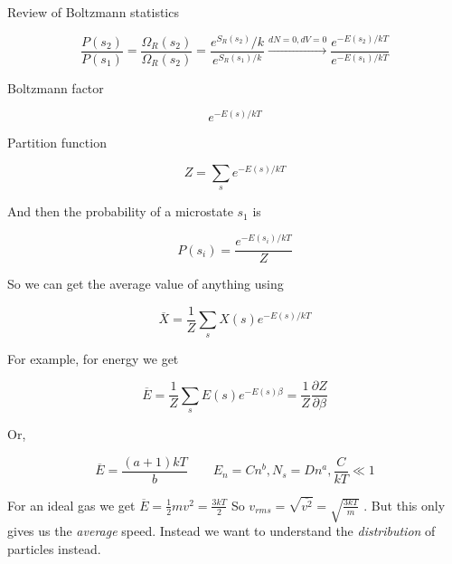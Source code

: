 \documentclass[10pt]{article}
\begin{document}
\begin{blockquote}
	Review of Boltzmann statistics

	\begin{equation}
		\frac{P(s_2)}{P(s_1)} = \frac{\Omega_R(s_2)}{\Omega_R(s_2)} = \frac{e^{S_R(s_2)} /k}{e^{S_R(s_1) /k}}  \xrightarrow{dN = 0, dV =0} \frac{e^{-E(s_2) /kT}}{e^{-E(s_1) /kT}}
	\end{equation}

	Boltzmann factor

	\begin{equation}
		e^{-E(s) /kT}
	\end{equation}

	Partition function

	\begin{equation}
		Z = \sum_s e^{-E(s) /kT}
	\end{equation}

	And then the probability of a microstate $ s_1 $ is

	\begin{equation}
		P(s_i) = \frac{e^{-E(s_i) /kT}}{Z}
	\end{equation}

	So we can get the average value of anything using


	\begin{equation}
		\overline{X} = \frac{1}{Z} \sum_s X(s) e^{-E(s) /kT}
	\end{equation}

	For example, for energy we get

	\begin{equation}
		\overline{E} = \frac{1}{Z} \sum_s E(s) e^{-E(s)\beta} = \frac{1}{Z} \frac{\partial Z}{\partial \beta} 
		\label{eq:294:avg_energy_equipartition}
	\end{equation}

	Or,

	\begin{equation}
		\overline{E} = \frac{(a+1)kT}{b}  \qquad E_n = Cn^b, N_s = Dn^a, \frac{C}{kT} \ll 1
	\end{equation}

	
	
\end{blockquote}





For an ideal gas we get $ \overline{E} = \frac{1}{2} mv^2 = \frac{3kT}{2}$ 
So $ v_{rms} = \sqrt{\overline{v^2}} = \sqrt{\frac{3kT}{m}}  $ .
But this only gives us the \textit{average} speed. 
Instead we want to understand the \textit{distribution}  of particles instead.
\end{document}
